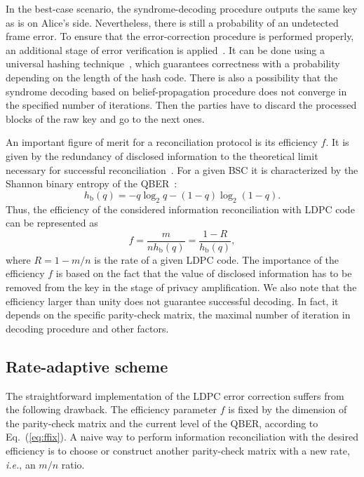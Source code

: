 \documentclass[aps,pra,twocolumn,amsmath,amssymb,nofootinbib,showpacs,superscriptaddress]{revtex4-1}
\newcommand{\hb}{h_\mathrm{b}}
\begin{document}
In the best-case scenario, the syndrome-decoding procedure outputs the same key as is on Alice's side.
Nevertheless, there is still a probability of an undetected frame error.
To ensure that the error-correction procedure is performed properly, an additional stage of error verification is applied~\cite{Gisin2,ChiHang}.
It can be done using a universal hashing technique~\cite{Carter1,Carter2}, which guarantees correctness with a probability depending on the length of the hash code.
There is also a possibility that the syndrome decoding based on belief-propagation procedure does not converge in the specified number of iterations. 
Then the parties have to discard the processed blocks of the raw key and go to the next ones.

An important figure of merit for a reconciliation protocol is its efficiency $f$. 
It is given by the redundancy of disclosed information to the theoretical limit necessary for successful reconciliation~\cite{SlWolf}.
For a given BSC it is characterized by the Shannon binary entropy of the QBER~\cite{BinaryEntropy}: 
\begin{equation} \label{eq:ffix}
	\hb(q)=-q\log_2q-(1-q)\log_2(1-q).
\end{equation}
Thus, the efficiency of the considered information reconciliation with LDPC code can be represented as
\begin{equation} \label{eq:ffix}
	f = \frac{m}{n\hb(q)}=\frac{1-R}{\hb(q)},
\end{equation}
where $R=1-m/n$ is the rate of a given LDPC code.
The importance of the efficiency $f$ is based on the fact that the value of disclosed information has to be removed from the key in the stage of privacy amplification.
We also note that the efficiency larger than unity does not guarantee successful decoding.
In fact, it depends on the specific parity-check matrix, the maximal number of iteration in decoding procedure and other factors.

\subsection{Rate-adaptive scheme}

The straightforward implementation of the LDPC error correction suffers from the following drawback. 
The efficiency parameter $f$ is fixed by the dimension of the parity-check matrix and the current level of the QBER, according to Eq.~(\ref{eq:ffix}).
A naive way to perform information reconciliation with the desired efficiency is to choose or construct another parity-check matrix with a new rate, {\it i.e.}, an $m/n$ ratio.
\end{document}
